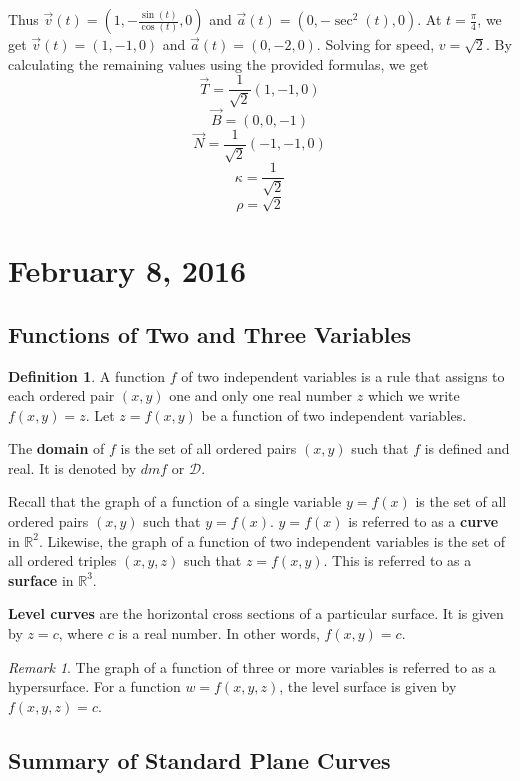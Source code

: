 \documentclass[11pt]{article}
\theoremstyle{plain} %
\theoremstyle{definition}
\newtheorem*{definition}{Definition} %
\theoremstyle{example}
\theoremstyle{remark}
\newtheorem*{remark}{Remark}
\begin{document}
Thus $\vec{v}(t) = \left( 1, -\frac{\sin(t)}{\cos(t)},0\right)$ and $\vec{a}(t) = \left(0, -\sec^2(t), 0\right)$. At $t= \frac{\pi}{4}$, we get $\vec{v}(t) = (1, -1, 0)$ and $\vec{a}(t) = (0,-2,0)$. Solving for speed, $v = \sqrt 2$. By calculating the remaining values using the provided formulas, we get $$\vec{T} = \frac{1}{\sqrt 2}(1, -1, 0)$$ $$\vec{B} = (0,0,-1)$$ $$\vec{N} = \frac{1}{\sqrt 2}(-1,-1,0)$$ $$\kappa = \frac{1}{\sqrt 2}$$ $$\rho= \sqrt{2}$$




\section{February 8, 2016}

\subsection{Functions of Two and Three Variables}
\begin{definition}
A function $f$ of two independent variables is a rule that assigns to each ordered pair $(x,y)$ one and only one real number $z$ which we write $f(x,y) =z$. Let $z = f(x,y)$ be a function of two independent variables.
\end{definition}
 

The \textbf{domain} of $f$ is the set of all ordered pairs $(x,y)$ such that $f$ is defined and real. It is denoted by $dmf$ or $\mathcal D$.

Recall that the graph of a function of a single variable $y=f(x)$ is the set of all ordered pairs $(x,y)$ such that $y=f(x)$. $y=f(x)$ is referred to as a \textbf{curve} in $\mathbb R^2$. Likewise, the graph of a function of two independent variables is the set of all ordered triples $(x, y, z)$ such that $z=f(x,y)$. This is referred to as a \textbf{surface} in $\mathbb R^3$.

\textbf{Level curves} are the horizontal cross sections of a particular surface. It is given by $z=c$, where $c$ is a real number. In other words, $f(x,y) = c$.

\begin{remark}
The graph of a function of three or more variables is referred to as a hypersurface. For a function $w = f(x, y, z)$, the level surface is given by $f(x, y, z) = c$.
\end{remark}

\subsection{Summary of Standard Plane Curves}
\end{document}
